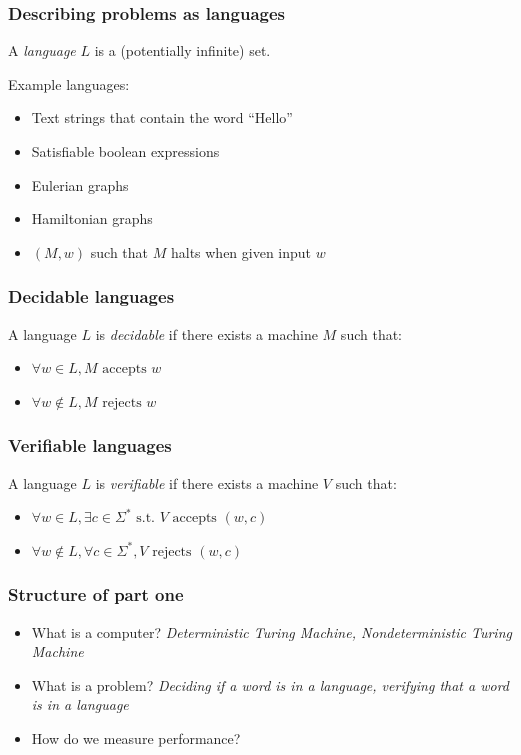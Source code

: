 \documentclass[aspectratio=169]{beamer}
\begin{document}
\begin{frame}
\frametitle{Describing problems as languages}
A {\em language} $L$ is a (potentially infinite) set.

Example languages:
\begin{itemize}
    \item<1-> Text strings that contain the word ``Hello''
    \item<2-> Satisfiable boolean expressions
    \item<3-> Eulerian graphs
    \item<4-> Hamiltonian graphs
    \item<5-> $(M, w)$ such that $M$ halts when given input $w$
\end{itemize}
\end{frame}

\begin{frame}
\frametitle{Decidable languages}
A language $L$ is {\em decidable} if there exists a machine $M$ such that:

\begin{itemize}
    \item $\forall w \in L, M \text{ accepts } w$
    \item $\forall w \notin L, M \text{ rejects } w$
\end{itemize}
\end{frame}

\begin{frame}
\frametitle{Verifiable languages}
A language $L$ is {\em verifiable} if there exists a machine $V$ such that:

\begin{itemize}
    \item $\forall w \in L, \exists c \in \Sigma^* \text{ s.t. } V \text{ accepts } (w,c)$
    \item $\forall w \notin L, \forall c \in \Sigma^*, V \text{ rejects } (w,c)$
\end{itemize}
\end{frame}

\begin{frame}
\frametitle{Structure of part one}
\begin{itemize}
    \item What is a computer? {\em Deterministic Turing Machine, Nondeterministic Turing Machine}
    \item What is a problem? {\em Deciding if a word is in a language, verifying that a word is in a language}
    \item How do we measure performance?
\end{itemize}
\end{frame}
\end{document}
